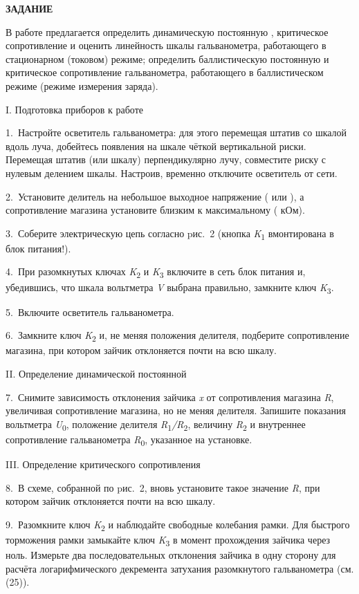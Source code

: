 \documentclass[]{article}
\begin{document}
\textbf{ЗАДАНИЕ}

В работе предлагается определить динамическую постоянную , критическое
сопротивление и оценить линейность шкалы гальванометра, работающего в
стационарном (токовом) режиме; определить баллистическую постоянную и
критическое сопротивление гальванометра, работающего в баллистическом
режиме (режиме измерения заряда).

I. Подготовка приборов к работе

1.~Настройте осветитель гальванометра: для этого перемещая штатив со
шкалой вдоль луча, добейтесь появления на шкале чёткой вертикальной
риски. Перемещая штатив (или шкалу) перпендикулярно лучу, совместите
риску с нулевым делением шкалы. Настроив, временно отключите осветитель
от сети.

2.~Установите делитель на небольшое выходное напряжение ( или ), а
сопротивление магазина установите близким к максимальному ( кОм).

3.~Соберите электрическую цепь согласно pис.~2 (кнопка
\emph{K}\textsubscript{1} вмонтирована в блок питания!).

4.~При разомкнутых ключах \emph{K}\textsubscript{2} и
\emph{K}\textsubscript{3} включите в сеть блок питания и, убедившись,
что шкала вольтметра \emph{V} выбрана правильно, замкните ключ
\emph{K}\textsubscript{3}.

5.~Включите осветитель гальванометра.

6.~Замкните ключ \emph{K}\textsubscript{2} и, не меняя положения
делителя, подберите сопротивление магазина, при котором зайчик
отклоняется почти на всю шкалу.

II. Определение динамической постоянной

7.~Снимите зависимость отклонения зайчика \emph{x} от сопротивления
магазина \emph{R}, увеличивая сопротивление магазина, но не меняя
делителя. Запишите показания вольтметра \emph{U}\textsubscript{0},
положение делителя \emph{R}\textsubscript{1}\emph{/R}\textsubscript{2},
величину \emph{R}\textsubscript{2} и внутреннее сопротивление
гальванометра \emph{R}\textsubscript{0}, указанное на установке.

III. Определение критического сопротивления

8.~В схеме, собранной по pис.~2, вновь установите такое значение
\emph{R}, при котором зайчик отклоняется почти на всю шкалу.

9.~Разомкните ключ \emph{K}\textsubscript{2} и наблюдайте свободные
колебания рамки. Для быстрого торможения рамки замыкайте ключ
\emph{K}\textsubscript{3} в момент прохождения зайчика через ноль.
Измерьте два последовательных отклонения зайчика в одну сторону для
расчёта логарифмического декремента затухания разомкнутого гальванометра
(см. (25)).
\end{document}
